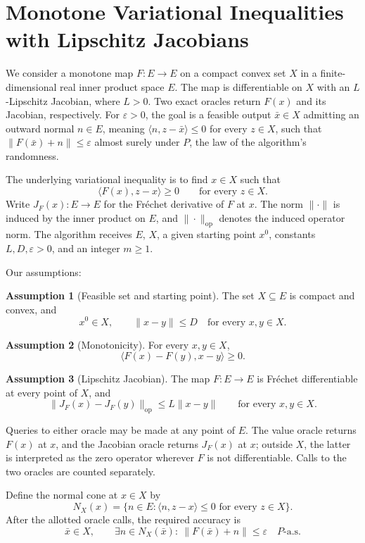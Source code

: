 \documentclass[10pt]{article}
\theoremstyle{definition}
\newtheorem{assumption}{Assumption}
\begin{document}
\section*{Monotone Variational Inequalities with Lipschitz Jacobians}
We consider a monotone map $F:E\to E$ on a compact convex set $X$ in a finite-dimensional real inner product space $E$. The map is differentiable on $X$ with an $L$-Lipschitz Jacobian, where $L>0$. Two exact oracles return $F(x)$ and its Jacobian, respectively. For $\varepsilon>0$, the goal is a feasible output $\bar{x}\in X$ admitting an outward normal $n\in E$, meaning $\langle n,z-\bar{x}\rangle\leq0$ for every $z\in X$, such that $\|F(\bar{x})+n\|\leq\varepsilon$ almost surely under $P$, the law of the algorithm's randomness.

The underlying variational inequality is to find $x\in X$ such that
\[
\langle F(x),z-x\rangle\geq0
\qquad\text{for every }z\in X.
\]
Write $J_F(x):E\to E$ for the Fr\'echet derivative of $F$ at $x$. The norm $\|\cdot\|$ is induced by the inner product on $E$, and $\|\cdot\|_{\mathrm{op}}$ denotes the induced operator norm. The algorithm receives $E$, $X$, a given starting point $x^0$, constants $L,D,\varepsilon>0$, and an integer $m\geq1$.

Our assumptions:
\begin{assumption}[Feasible set and starting point]
The set $X\subseteq E$ is compact and convex, and
\[
x^0\in X,
\qquad
\|x-y\|\leq D\quad\text{for every }x,y\in X.
\]
\end{assumption}

\begin{assumption}[Monotonicity]
For every $x,y\in X$,
\[
\langle F(x)-F(y),x-y\rangle\geq0.
\]
\end{assumption}

\begin{assumption}[Lipschitz Jacobian]
The map $F:E\to E$ is Fr\'echet differentiable at every point of $X$, and
\[
\|J_F(x)-J_F(y)\|_{\mathrm{op}}
\leq L\|x-y\|
\qquad\text{for every }x,y\in X.
\]
\end{assumption}

Queries to either oracle may be made at any point of $E$. The value oracle returns $F(x)$ at $x$, and the Jacobian oracle returns $J_F(x)$ at $x$; outside $X$, the latter is interpreted as the zero operator wherever $F$ is not differentiable. Calls to the two oracles are counted separately.

Define the normal cone at $x\in X$ by
\[
N_X(x)=\{n\in E:\langle n,z-x\rangle\leq0
\text{ for every }z\in X\}.
\]
After the allotted oracle calls, the required accuracy is
\[
\bar{x}\in X,
\qquad
\exists n\in N_X(\bar{x}):\
\|F(\bar{x})+n\|\leq\varepsilon
\quad P\text{-a.s.}
\]
\end{document}
